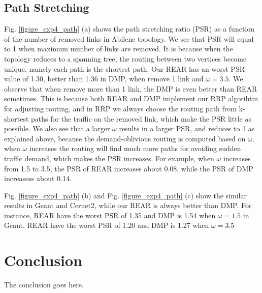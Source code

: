 \documentclass[conference]{IEEEtran}
\begin{document}
\subsection{Path Stretching}
Fig. \ref{figure_exp4_path} (a) shows the path stretching ratio (PSR) as a function of the number of removed links in Abilene topology. We see that PSR will 
equal to 1 when maximum number of links are removed. It is because when the topology reduces to a spanning tree, the routing between two 
vertices become unique, namely each path is the shortest path. Our REAR has an worst PSR value of 1.30, better than 1.36 in DMP, when 
remove 1 link and $\omega = 3.5$. We observe that when remove more than 1 link, the DMP is even better than REAR sometimes. This is 
because both REAR and DMP implement our RRP algorihtm for adjusting routing, and in RRP we always choose the routing path from k-shortest 
paths for the traffic on the removed link, which make the PSR little as possible. We also see that a larger $\omega$ results in a 
larger PSR, and reduces to 1 as explained above, because the demand-oblivious routing is computed based on $\omega$, when $\omega$ increases
the routing will find much more paths for avoiding sudden traffic demand, which makes the PSR increases. For example, when $\omega$ increases
from 1.5 to 3.5, the PSR of REAR increases about 0.08, while the PSR of DMP increasess about 0.14.

Fig. \ref{figure_exp4_path} (b) and Fig. \ref{figure_exp4_path} (c) show the similar results in Geant and Cernet2, while our REAR is always better than DMP. For instance, REAR
have the worst PSR of 1.35 and DMP is 1.54 when $\omega = 1.5$ in Geant, REAR have the worst PSR of 1.20 and DMP is 1.27 when $\omega = 3.5$


\section{Conclusion}
\label{conclusion}
The conclusion goes here.
\end{document}
